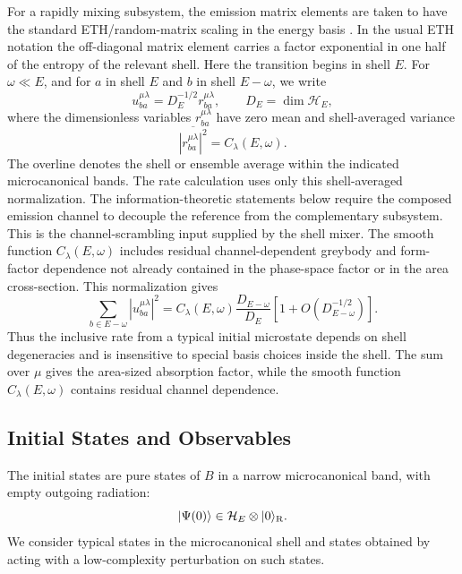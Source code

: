 \documentclass[12pt]{article}
\newcommand{\ket}[1]{|#1\rangle}
\begin{document}
For a rapidly mixing subsystem, the emission matrix elements are taken to have
the standard ETH/random-matrix scaling in the energy basis
\cite{Deutsch1991,Srednicki1994}.  In the usual ETH notation the off-diagonal
matrix element carries a factor exponential in one half of the entropy of the
relevant shell.  Here the transition begins in shell $E$.  For $\omega\ll E$,
and for $a$ in shell $E$ and $b$ in shell $E-\omega$, we write
\begin{equation}
    u^{\mu\lambda}_{ba}=D_E^{-1/2} r^{\mu\lambda}_{ba},
    \qquad D_E=\dim \mathcal H_E,
\end{equation}
where the dimensionless variables $r^{\mu\lambda}_{ba}$ have zero mean and shell-averaged
variance
\begin{equation}
    \overline{|r^{\mu\lambda}_{ba}|^2}=C_\lambda(E,\omega).
\end{equation}
The overline denotes the shell or ensemble average within the indicated
microcanonical bands.
The rate calculation uses only this shell-averaged normalization.  The
information-theoretic statements below require the composed emission channel to
decouple the reference from the complementary subsystem.  This is the
channel-scrambling input supplied by the shell mixer.
The smooth function $C_\lambda(E,\omega)$ includes residual channel-dependent
greybody and form-factor dependence not already contained in the phase-space
factor or in the area cross-section.  This
normalization gives
\begin{equation}
    \sum_{b\in E-\omega}|u^{\mu\lambda}_{ba}|^2
    =
    C_\lambda(E,\omega)
    \frac{D_{E-\omega}}{D_E}
    \left[1+O(D_{E-\omega}^{-1/2})\right].
\label{eq:inclusive-u}
\end{equation}
Thus the inclusive rate from a typical initial microstate depends on shell
degeneracies and is insensitive to special basis choices inside the shell.  The
sum over $\mu$ gives the area-sized absorption factor, while the smooth
function $C_\lambda(E,\omega)$ contains residual channel dependence.

\subsection{Initial States and Observables}

The initial states are pure states of $B$ in a narrow microcanonical band, with
empty outgoing radiation:
\begin{equation}
    \ket{\Psi(0)}\in \mathcal H_E\otimes\ket{0}_{\rm R}.
\end{equation}
We consider typical states in the microcanonical shell and states obtained by
acting with a low-complexity perturbation on such states.
\end{document}
